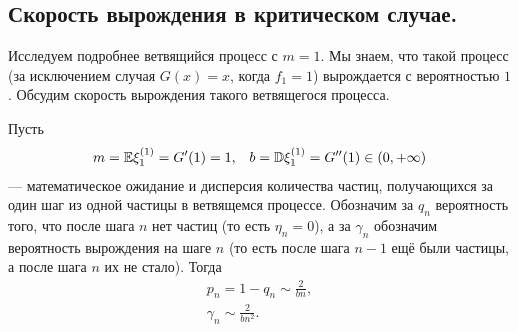 \documentclass[../main.tex]{subfiles}
\begin{document}
 \subsection{Скорость вырождения в критическом случае.}

 Исследуем подробнее ветвящийся процесс с $ m = 1 $. Мы знаем, что такой процесс (за исключением случая $ G(x) = x $, когда $ f_1 = 1 $) вырождается с вероятностью $ 1 $. Обсудим скорость вырождения такого ветвящегося процесса.

 \begin{thm}
  Пусть
  \begin{align*}
   m = \mathbb E \xi_1^{(1)} = G'(1) = 1, && b = \mathbb D \xi_1^{(1)} = G''(1) \in (0, +\infty)
  \end{align*}
  --- математическое ожидание и дисперсия количества частиц, получающихся за один шаг из одной частицы в ветвящемся процессе. Обозначим за $ q_n $ вероятность того, что после шага $ n $ нет частиц (то есть $ \eta_n=0 $), а за $ \gamma_n $ обозначим вероятность вырождения на шаге $ n $ (то есть после шага $ n-1 $ ещё были частицы, а после шага $ n $ их не стало). Тогда
  \begin{align}
   \label{eq1:thm:speed_of_branching_process} p_n = 1 - q_n \sim \frac{2}{bn}, \\
   \label{eq2:thm:speed_of_branching_process} \gamma_n \sim \frac{2}{bn^{2}}.
  \end{align}
 \end{thm}
\end{document}
